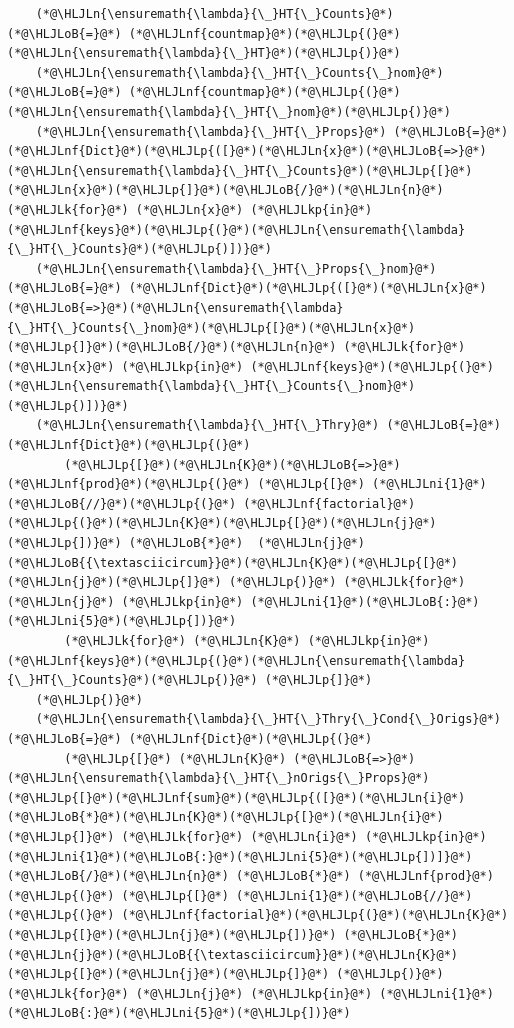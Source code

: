 \documentclass[12pt,a4paper]{article}
\newcommand{\HLJLk}[1]{\textcolor[RGB]{148,91,176}{\textbf{#1}}}
\newcommand{\HLJLkp}[1]{\textcolor[RGB]{148,91,176}{\textbf{#1}}}
\newcommand{\HLJLn}[1]{#1}
\newcommand{\HLJLnf}[1]{\textcolor[RGB]{66,102,213}{#1}}
\newcommand{\HLJLni}[1]{\textcolor[RGB]{59,151,46}{#1}}
\newcommand{\HLJLoB}[1]{\textcolor[RGB]{102,102,102}{\textbf{#1}}}
\newcommand{\HLJLp}[1]{#1}
\begin{document}
\begin{lstlisting}
	(*@\HLJLn{\ensuremath{\lambda}{\_}HT{\_}Counts}@*) (*@\HLJLoB{=}@*) (*@\HLJLnf{countmap}@*)(*@\HLJLp{(}@*)(*@\HLJLn{\ensuremath{\lambda}{\_}HT}@*)(*@\HLJLp{)}@*)
	(*@\HLJLn{\ensuremath{\lambda}{\_}HT{\_}Counts{\_}nom}@*) (*@\HLJLoB{=}@*) (*@\HLJLnf{countmap}@*)(*@\HLJLp{(}@*)(*@\HLJLn{\ensuremath{\lambda}{\_}HT{\_}nom}@*)(*@\HLJLp{)}@*)
	(*@\HLJLn{\ensuremath{\lambda}{\_}HT{\_}Props}@*) (*@\HLJLoB{=}@*) (*@\HLJLnf{Dict}@*)(*@\HLJLp{([}@*)(*@\HLJLn{x}@*)(*@\HLJLoB{=>}@*)(*@\HLJLn{\ensuremath{\lambda}{\_}HT{\_}Counts}@*)(*@\HLJLp{[}@*)(*@\HLJLn{x}@*)(*@\HLJLp{]}@*)(*@\HLJLoB{/}@*)(*@\HLJLn{n}@*) (*@\HLJLk{for}@*) (*@\HLJLn{x}@*) (*@\HLJLkp{in}@*) (*@\HLJLnf{keys}@*)(*@\HLJLp{(}@*)(*@\HLJLn{\ensuremath{\lambda}{\_}HT{\_}Counts}@*)(*@\HLJLp{)])}@*)
	(*@\HLJLn{\ensuremath{\lambda}{\_}HT{\_}Props{\_}nom}@*) (*@\HLJLoB{=}@*) (*@\HLJLnf{Dict}@*)(*@\HLJLp{([}@*)(*@\HLJLn{x}@*)(*@\HLJLoB{=>}@*)(*@\HLJLn{\ensuremath{\lambda}{\_}HT{\_}Counts{\_}nom}@*)(*@\HLJLp{[}@*)(*@\HLJLn{x}@*)(*@\HLJLp{]}@*)(*@\HLJLoB{/}@*)(*@\HLJLn{n}@*) (*@\HLJLk{for}@*) (*@\HLJLn{x}@*) (*@\HLJLkp{in}@*) (*@\HLJLnf{keys}@*)(*@\HLJLp{(}@*)(*@\HLJLn{\ensuremath{\lambda}{\_}HT{\_}Counts{\_}nom}@*)(*@\HLJLp{)])}@*)
	(*@\HLJLn{\ensuremath{\lambda}{\_}HT{\_}Thry}@*) (*@\HLJLoB{=}@*) (*@\HLJLnf{Dict}@*)(*@\HLJLp{(}@*)
		(*@\HLJLp{[}@*)(*@\HLJLn{K}@*)(*@\HLJLoB{=>}@*) (*@\HLJLnf{prod}@*)(*@\HLJLp{(}@*) (*@\HLJLp{[}@*) (*@\HLJLni{1}@*)(*@\HLJLoB{//}@*)(*@\HLJLp{(}@*) (*@\HLJLnf{factorial}@*)(*@\HLJLp{(}@*)(*@\HLJLn{K}@*)(*@\HLJLp{[}@*)(*@\HLJLn{j}@*)(*@\HLJLp{])}@*) (*@\HLJLoB{*}@*)  (*@\HLJLn{j}@*)(*@\HLJLoB{{\textasciicircum}}@*)(*@\HLJLn{K}@*)(*@\HLJLp{[}@*)(*@\HLJLn{j}@*)(*@\HLJLp{]}@*) (*@\HLJLp{)}@*) (*@\HLJLk{for}@*) (*@\HLJLn{j}@*) (*@\HLJLkp{in}@*) (*@\HLJLni{1}@*)(*@\HLJLoB{:}@*)(*@\HLJLni{5}@*)(*@\HLJLp{])}@*) 
		(*@\HLJLk{for}@*) (*@\HLJLn{K}@*) (*@\HLJLkp{in}@*) (*@\HLJLnf{keys}@*)(*@\HLJLp{(}@*)(*@\HLJLn{\ensuremath{\lambda}{\_}HT{\_}Counts}@*)(*@\HLJLp{)}@*) (*@\HLJLp{]}@*)
	(*@\HLJLp{)}@*)
	(*@\HLJLn{\ensuremath{\lambda}{\_}HT{\_}Thry{\_}Cond{\_}Origs}@*) (*@\HLJLoB{=}@*) (*@\HLJLnf{Dict}@*)(*@\HLJLp{(}@*)
		(*@\HLJLp{[}@*) (*@\HLJLn{K}@*) (*@\HLJLoB{=>}@*) (*@\HLJLn{\ensuremath{\lambda}{\_}HT{\_}nOrigs{\_}Props}@*)(*@\HLJLp{[}@*)(*@\HLJLnf{sum}@*)(*@\HLJLp{([}@*)(*@\HLJLn{i}@*)(*@\HLJLoB{*}@*)(*@\HLJLn{K}@*)(*@\HLJLp{[}@*)(*@\HLJLn{i}@*)(*@\HLJLp{]}@*) (*@\HLJLk{for}@*) (*@\HLJLn{i}@*) (*@\HLJLkp{in}@*) (*@\HLJLni{1}@*)(*@\HLJLoB{:}@*)(*@\HLJLni{5}@*)(*@\HLJLp{])]}@*)(*@\HLJLoB{/}@*)(*@\HLJLn{n}@*) (*@\HLJLoB{*}@*) (*@\HLJLnf{prod}@*)(*@\HLJLp{(}@*) (*@\HLJLp{[}@*) (*@\HLJLni{1}@*)(*@\HLJLoB{//}@*)(*@\HLJLp{(}@*) (*@\HLJLnf{factorial}@*)(*@\HLJLp{(}@*)(*@\HLJLn{K}@*)(*@\HLJLp{[}@*)(*@\HLJLn{j}@*)(*@\HLJLp{])}@*) (*@\HLJLoB{*}@*)  (*@\HLJLn{j}@*)(*@\HLJLoB{{\textasciicircum}}@*)(*@\HLJLn{K}@*)(*@\HLJLp{[}@*)(*@\HLJLn{j}@*)(*@\HLJLp{]}@*) (*@\HLJLp{)}@*) (*@\HLJLk{for}@*) (*@\HLJLn{j}@*) (*@\HLJLkp{in}@*) (*@\HLJLni{1}@*)(*@\HLJLoB{:}@*)(*@\HLJLni{5}@*)(*@\HLJLp{])}@*) 

\end{lstlisting}
\end{document}
